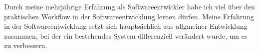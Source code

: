 		Durch meine mehrjährige Erfahrung als Softwareentwickler habe ich viel über den praktischen Workflow in der Softwareentwicklung lernen dürfen.
		Meine Erfahrung in der Softwareentwicklung setzt sich hauptsächlich aus allgmeiner Entwicklung zusammen, bei der ein bestehendes System differenziell verändert wurde, um es zu verbessern.